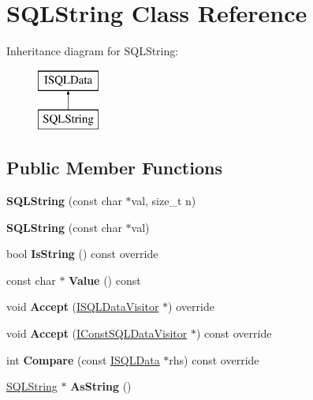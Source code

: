 \hypertarget{class_s_q_l_string}{}\section{S\+Q\+L\+String Class Reference}
\label{class_s_q_l_string}
Inheritance diagram for S\+Q\+L\+String\+:\begin{figure}[H]
\begin{center}
\leavevmode
\includegraphics[height=2.000000cm]{class_s_q_l_string}
\end{center}
\end{figure}
\subsection*{Public Member Functions}
\begin{DoxyCompactItemize}
\item 
\mbox{\label{class_s_q_l_string_a68051496c207eccebc1dbe2a5d9ac0f2}} 
{\bfseries S\+Q\+L\+String} (const char $\ast$val, size\+\_\+t n)
\item 
\mbox{\label{class_s_q_l_string_ade5936ed0f882fcaebb3e229eadbe427}} 
{\bfseries S\+Q\+L\+String} (const char $\ast$val)
\item 
\mbox{\label{class_s_q_l_string_ae7e3b0e18b75a23ba719f9cbf5156f47}} 
bool {\bfseries Is\+String} () const override
\item 
\mbox{\label{class_s_q_l_string_a352fea27df7a6fffcc15ef4348bfc72f}} 
const char $\ast$ {\bfseries Value} () const
\item 
\mbox{\label{class_s_q_l_string_a1fc307f95c7f37138a92b0f42c0268bc}} 
void {\bfseries Accept} (\mbox{\hyperlink{class_i_s_q_l_data_visitor}{I\+S\+Q\+L\+Data\+Visitor}} $\ast$) override
\item 
\mbox{\label{class_s_q_l_string_a0e83bec6a3b70d7cc754ef1b3a1ee43f}} 
void {\bfseries Accept} (\mbox{\hyperlink{class_i_const_s_q_l_data_visitor}{I\+Const\+S\+Q\+L\+Data\+Visitor}} $\ast$) const override
\item 
\mbox{\label{class_s_q_l_string_a9c67e677c12a9901f1f8874c9f334a8b}} 
int {\bfseries Compare} (const \mbox{\hyperlink{class_i_s_q_l_data}{I\+S\+Q\+L\+Data}} $\ast$rhs) const override
\item 
\mbox{\label{class_s_q_l_string_a802cd61f7214cd525d85e5a50ff69a68}} 
\mbox{\hyperlink{class_s_q_l_string}{S\+Q\+L\+String}} $\ast$ {\bfseries As\+String} ()
\end{DoxyCompactItemize}
